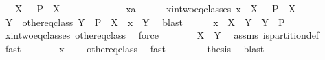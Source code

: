 \begin{isabellebody}
\ \ \ {\isachardoublequoteopen}X\ {\isasyminter}\ {\isasymUnion}\ {\isacharparenleft}P\ {\isacharminus}\ {\isacharbraceleft}X{\isacharbraceright}{\isacharparenright}\ {\isacharequal}\ {\isacharbraceleft}{\isacharbraceright}{\isachardoublequoteclose}\ \isanewline
%
\isadelimproof
%
\endisadelimproof
%
\isatagproof
{}\isamarkupfalse%
\ {\isacharminus}\isanewline
\ \ \isacommand{{\isacharbraceleft}}\isamarkupfalse%
\isanewline
\ \ \ \ \isamarkupfalse%
\ x{\isacharcolon}{\isacharcolon}{\isacharprime}a\isanewline
\ \ \ \ \isamarkupfalse%
\ x{\isacharunderscore}in{\isacharunderscore}two{\isacharunderscore}eq{\isacharunderscore}classes{\isacharcolon}\ {\isachardoublequoteopen}x\ {\isasymin}\ X\ {\isasyminter}\ {\isasymUnion}\ {\isacharparenleft}P\ {\isacharminus}\ {\isacharbraceleft}X{\isacharbraceright}{\isacharparenright}{\isachardoublequoteclose}\isanewline
\ \ \ \ \isamarkupfalse%
\ \isamarkupfalse%
\ Y\ \ other{\isacharunderscore}eq{\isacharunderscore}class{\isacharcolon}\ {\isachardoublequoteopen}Y\ {\isasymin}\ P\ {\isacharminus}\ {\isacharbraceleft}X{\isacharbraceright}\ {\isasymand}\ x\ {\isasymin}\ Y{\isachardoublequoteclose}\ \isamarkupfalse%
\ blast\isanewline
\ \ \ \ \isamarkupfalse%
\ {\isachardoublequoteopen}x\ {\isasymin}\ X\ {\isasyminter}\ Y\ {\isasymand}\ Y\ {\isasymin}\ P{\isachardoublequoteclose}\isanewline
\ \ \ \ \ \ \isamarkupfalse%
\ x{\isacharunderscore}in{\isacharunderscore}two{\isacharunderscore}eq{\isacharunderscore}classes\ other{\isacharunderscore}eq{\isacharunderscore}class\ \isamarkupfalse%
\ force\isanewline
\ \ \ \ \isamarkupfalse%
\ \isamarkupfalse%
\ {\isachardoublequoteopen}X\ {\isacharequal}\ Y{\isachardoublequoteclose}\ \isamarkupfalse%
\ assms\ is{\isacharunderscore}partition{\isacharunderscore}def\ \isamarkupfalse%
\ fast\isanewline
\ \ \ \ \isamarkupfalse%
\ \isamarkupfalse%
\ {\isachardoublequoteopen}x\ {\isasymin}\ {\isacharbraceleft}{\isacharbraceright}{\isachardoublequoteclose}\ \isamarkupfalse%
\ other{\isacharunderscore}eq{\isacharunderscore}class\ \isamarkupfalse%
\ fast\isanewline
\ \ \isacommand{{\isacharbraceright}}\isamarkupfalse%
\isanewline
\ \ \isamarkupfalse%
\ \isamarkupfalse%
\ {\isacharquery}thesis\ \isamarkupfalse%
\ blast\isanewline
{}\isamarkupfalse%

\end{isabellebody}
